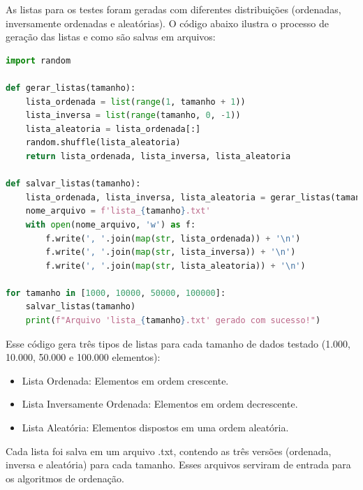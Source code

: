 \documentclass[tcc2]{uftex}
\begin{document}
As listas para os testes foram geradas com diferentes distribuições (ordenadas, inversamente ordenadas e aleatórias). O código abaixo ilustra o processo de geração das listas e como são salvas em arquivos:

\begin{lstlisting}[language=python]
import random

def gerar_listas(tamanho):
    lista_ordenada = list(range(1, tamanho + 1))
    lista_inversa = list(range(tamanho, 0, -1))
    lista_aleatoria = lista_ordenada[:]
    random.shuffle(lista_aleatoria)
    return lista_ordenada, lista_inversa, lista_aleatoria

def salvar_listas(tamanho):
    lista_ordenada, lista_inversa, lista_aleatoria = gerar_listas(tamanho)
    nome_arquivo = f'lista_{tamanho}.txt'
    with open(nome_arquivo, 'w') as f:
        f.write(', '.join(map(str, lista_ordenada)) + '\n')
        f.write(', '.join(map(str, lista_inversa)) + '\n')
        f.write(', '.join(map(str, lista_aleatoria)) + '\n')

for tamanho in [1000, 10000, 50000, 100000]:
    salvar_listas(tamanho)
    print(f"Arquivo 'lista_{tamanho}.txt' gerado com sucesso!")

\end{lstlisting}

Esse código gera três tipos de listas para cada tamanho de dados testado (1.000, 10.000, 50.000 e 100.000 elementos):
\begin{itemize}
    \item Lista Ordenada: Elementos em ordem crescente.
    \item Lista Inversamente Ordenada: Elementos em ordem decrescente.
    \item Lista Aleatória: Elementos dispostos em uma ordem aleatória.
\end{itemize}
    
   

Cada lista foi salva em um arquivo .txt, contendo as três versões (ordenada, inversa e aleatória) para cada tamanho. Esses arquivos serviram de entrada para os algoritmos de ordenação.
\end{document}
